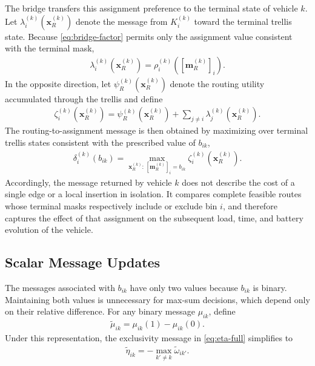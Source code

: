 The bridge transfers this assignment preference to the terminal state of vehicle $k$. Let $\lambda_i^{(k)}(\mathbf{x}_R^{(k)})$ denote the message from $K_i^{(k)}$ toward the terminal trellis state. Because \eqref{eq:bridge-factor} permits only the assignment value consistent with the terminal mask,
\begin{align}
    \lambda_i^{(k)}(\mathbf{x}_R^{(k)})
    =\rho_i^{(k)}\!\left([\mathbf m_R^{(k)}]_i\right).
    \label{eq:lambda-full}
\end{align}
In the opposite direction, let $\psi_R^{(k)}(\mathbf{x}_R^{(k)})$ denote the routing utility accumulated through the trellis and define
\begin{align}
    \zeta_i^{(k)}(\mathbf{x}_R^{(k)})
    =\psi_R^{(k)}(\mathbf{x}_R^{(k)})
    +\sum_{j\neq i}\lambda_j^{(k)}(\mathbf{x}_R^{(k)}).
    \label{eq:zeta-full}
\end{align}
The routing-to-assignment message is then obtained by maximizing over terminal trellis states consistent with the prescribed value of $b_{ik}$,
\begin{align}
    \delta_i^{(k)}(b_{ik})
    =\max_{\mathbf{x}_R^{(k)}:\,[\mathbf m_R^{(k)}]_i=b_{ik}}
    \zeta_i^{(k)}(\mathbf{x}_R^{(k)}).
    \label{eq:delta-full}
\end{align}
Accordingly, the message returned by vehicle $k$ does not describe the cost of a single edge or a local insertion in isolation. It compares complete feasible routes whose terminal masks respectively include or exclude bin $i$, and therefore captures the effect of that assignment on the subsequent load, time, and battery evolution of the vehicle.

\subsection{Scalar Message Updates}
\label{sec:scalar-messages}

The messages associated with $b_{ik}$ have only two values because $b_{ik}$ is binary. Maintaining both values is unnecessary for max-sum decisions, which depend only on their relative difference. For any binary message $\mu_{ik}$, define
\begin{align}
    \widetilde{\mu}_{ik}
    =\mu_{ik}(1)-\mu_{ik}(0).
    \label{eq:scalar-definition}
\end{align}
Under this representation, the exclusivity message in \eqref{eq:eta-full} simplifies to
\begin{align}
    \widetilde{\eta}_{ik}
    =-\max_{k'\neq k}\widetilde{\omega}_{ik'}.
    \label{eq:eta-update}
\end{align}

